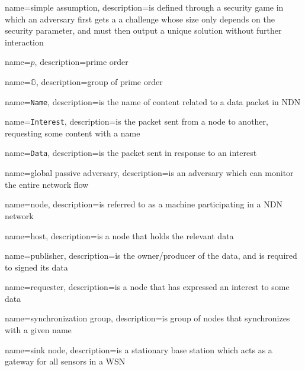 {
  name=simple assumption,
  description={is defined through a security game in which an adversary first gets a a challenge whose size only depends on the security
  parameter, and must then output a unique solution without further interaction~\cite{DBLP:conf/pkc/HofheinzKS15}}
}

{
  name=$p$,
  description={prime order}
}

{
  name=$\mathbb{G}$,
  description={group of prime order}
}

{
  name=\texttt{Name},
  description={is the name of content related to a \gls{data} packet in NDN}
}

{
  name=\texttt{Interest},
  description={is the packet sent from a node to another, requesting some content with a \gls{name}}
}


{
  name=\texttt{Data},
  description={is the packet sent in response to an \gls{interest}}
}

{
  name=global passive adversary,
  description={is an adversary which can monitor the entire network flow}
}

{
  name=node,
  description={is referred to as a machine participating in a \gls{NDN} network}
}

{
  name=host,
  description={is a node that holds the relevant \gls{data}}
}

{
  name=publisher,
  description={is the owner/producer of the \gls{data}, and is required to signed its \gls{data}}
}

{
  name=requester,
  description={is a node that has expressed an \gls{interest} to some \gls{data}}
}

{
  name=synchronization group,
  description={is group of nodes that synchronizes with a given \gls{name}}
}

{
  name=sink node,
  description={is a stationary base station which acts as a gateway for all sensors in a WSN~\cite[Section 1.1]{Patil:2012:SWS:2464778}}
}